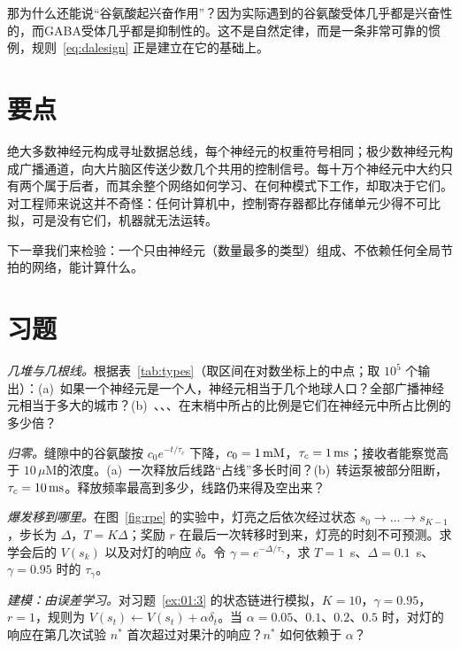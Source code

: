 那为什么还能说“谷氨酸起兴奋作用”？因为实际遇到的谷氨酸受体几乎都是兴奋性的，而GABA受体几乎都是抑制性的。这不是自然定律，而是一条非常可靠的惯例，规则~\eqref{eq:dalesign} 正是建立在它的基础上。

\section{要点}

绝大多数神经元构成寻址数据总线，每个神经元的权重符号相同；极少数神经元构成广播通道，向大片脑区传送少数几个共用的控制信号。每十万个神经元中大约只有两个属于后者，而其余整个网络如何学习、在何种模式下工作，却取决于它们。对工程师来说这并不奇怪：任何计算机中，控制寄存器都比存储单元少得不可比拟，可是没有它们，机器就无法运转。

下一章我们来检验：一个只由神经元（数量最多的类型）组成、不依赖任何全局节拍的网络，能计算什么。

\section{习题}

\begin{exercise}[\lvlA]
\label{ex:01:1}
\emph{几堆与几根线。}根据表~\ref{tab:types}（取区间在对数坐标上的中点；取 $10^5$ 个输出）：(a)~如果一个神经元是一个人，神经元相当于几个地球人口？全部广播神经元相当于多大的城市？(b)~、、、在末梢中所占的比例是它们在神经元中所占比例的多少倍？
\end{exercise}

\begin{exercise}[\lvlA]
\label{ex:01:2}
\emph{归零。}缝隙中的谷氨酸按 $c_0e^{-t/\tau_c}$ 下降，$c_0=1\,\text{mM}$，$\tau_c=1\,\text{ms}$；接收者能察觉高于 $10\,\mu$M的浓度。(a)~一次释放后线路“占线”多长时间？(b)~转运泵被部分阻断，$\tau_c=10\,\text{ms}$。释放频率最高到多少，线路仍来得及空出来？
\end{exercise}

\begin{exercise}[\lvlB]
\label{ex:01:3}
\emph{爆发移到哪里。}在图~\ref{fig:rpe} 的实验中，灯亮之后依次经过状态 $s_0\to\dots\to s_{K-1}$，步长为 $\Delta$，$T=K\Delta$；奖励 $r$ 在最后一次转移时到来，灯亮的时刻不可预测。求学会后的 $V(s_k)$ 以及对灯的响应 $\delta$。令 $\gamma=e^{-\Delta/\tau_\gamma}$，求 $T=1$~s、$\Delta=0.1$~s、$\gamma=0.95$ 时的 $\tau_\gamma$。
\end{exercise}

\begin{exercise}[\lvlB]
\label{ex:01:4}
\emph{建模：由误差学习。}对习题~\ref{ex:01:3} 的状态链进行模拟，$K=10$，$\gamma=0.95$，$r=1$，规则为 $V(s_t)\leftarrow V(s_t)+\alpha\delta_t$。当 $\alpha=0.05$、$0.1$、$0.2$、$0.5$ 时，对灯的响应在第几次试验 $n^*$ 首次超过对果汁的响应？$n^*$ 如何依赖于 $\alpha$？
\end{exercise}

